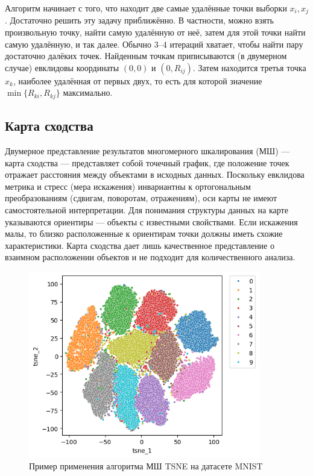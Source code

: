 Алгоритм начинает с того, что находит две самые удалённые точки выборки $x_i, x_j$. Достаточно	решить эту задачу приближённо. В частности, можно взять произвольную точку,	найти самую удалённую от неё, затем для этой точки найти самую удалённую, и так	далее. Обычно 3–4 итераций хватает, чтобы найти пару достаточно далёких точек.	Найденным точкам приписываются (в двумерном случае) евклидовы координаты
$(0, 0)$ и $(0, R_{ij} )$. Затем находится третья точка $x_k$, наиболее удалённая от первых двух, то есть для которой значение $\min \{R_{ki}, R_{kj}\}$ максимально. 

\subsection*{Карта сходства}

Двумерное представление результатов многомерного шкалирования (МШ) — карта сходства — представляет собой точечный график, где положение точек отражает расстояния между объектами в исходных данных. Поскольку евклидова метрика и стресс (мера искажения) инвариантны к ортогональным преобразованиям (сдвигам, поворотам, отражениям), оси карты не имеют самостоятельной интерпретации. Для понимания структуры данных на карте указываются ориентиры — объекты с известными свойствами. Если искажения малы, то близко расположенные к ориентирам точки должны иметь схожие характеристики. Карта сходства дает лишь качественное представление о взаимном расположении объектов и не подходит для количественного анализа.

\begin{figure}[ht]
    \centering
    \begin{minipage}{0.45\textwidth}
        \centering
        \includegraphics[width=0.9\textwidth]{chapters/clustering/png/tsne-mnist.png}
        \caption{Пример применения алгоритма МШ TSNE на датасете MNIST}
    \end{minipage}
\end{figure}

